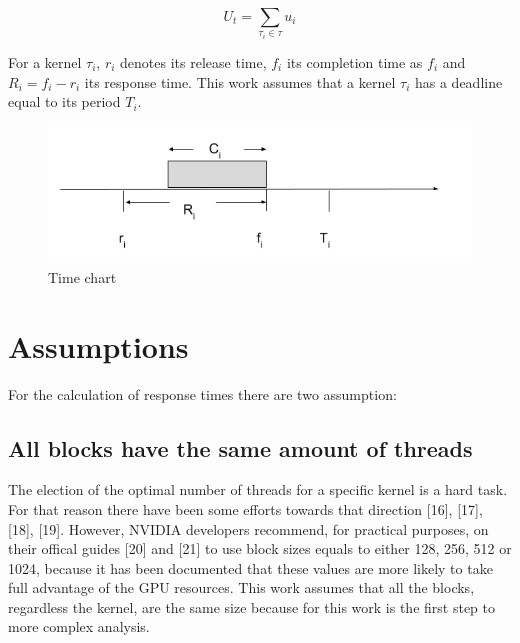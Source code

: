\documentclass[
  12pt,
  a4paperpaper,
]{report}
\begin{document}
\begin{equation} 
U_t = \sum_{\tau_i \in \tau} u_i
\label{eq:task_utilization}
\end{equation}

For a kernel \(\tau_i\), \(r_i\) denotes its release  time, \(f_i\) its completion time as \(f_i\) and \(R_i = f_i - r_i\) its response time.
This work assumes that a kernel \(\tau_i\) has a deadline equal to its period \(T_i\).

\begin{figure}
\centering
\includegraphics[width=1\textwidth,height=\textheight]{source/figures/task_timing.png}
\caption{Time chart \label{img:task_timing}}
\end{figure}

\hypertarget{assumptions}{%
\section{Assumptions}\label{assumptions}}

For the calculation of response times there are two assumption:

\hypertarget{all-blocks-have-the-same-amount-of-threads}{%
\subsection{All blocks have the same amount of
threads}\label{all-blocks-have-the-same-amount-of-threads}}

The election of the optimal number of threads for a specific kernel is a hard task.
For that reason there have been some efforts towards that
direction {[}16{]}, {[}17{]}, {[}18{]}, {[}19{]}. However, NVIDIA
developers recommend, for practical purposes, on their offical guides
{[}20{]} and {[}21{]} to use block sizes equals to either 128, 256, 512
or 1024, because it has been documented that these values are more
likely to take full advantage of the GPU resources. 
This work assumes that all the blocks, regardless the kernel, are the same size because for this work is the first step to more complex analysis.
\end{document}

